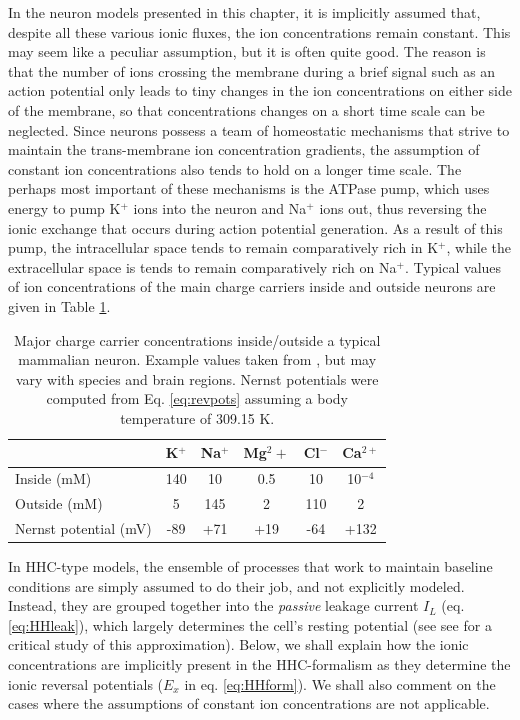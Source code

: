 In the neuron models presented in this chapter, it is implicitly assumed that, despite all these various ionic fluxes, the ion concentrations remain constant. This may seem like a peculiar assumption, but it is often quite good. The reason is that the number of ions crossing the membrane during a brief signal such as an action potential only leads to tiny changes in the ion concentrations on either side of the membrane, so that concentrations changes on a short time scale can be neglected. Since neurons possess a team of homeostatic mechanisms that strive to maintain the trans-membrane ion concentration gradients, the
assumption of constant ion concentrations also tends to hold on a longer time scale.  The perhaps most important of these mechanisms is the ATPase pump, which uses energy to pump K$^+$ ions into the neuron and Na$^+$ ions out, thus reversing the ionic exchange that occurs during action potential generation. As a result of this pump, the intracellular space tends to remain comparatively rich in K$^+$, while the extracellular space is tends to remain comparatively rich on Na$^+$. Typical values of ion concentrations of the main charge carriers inside and outside neurons are given in Table \ref{table:ion-concentrations}. 

\begin{table}[h]
\centering
\caption{Major charge carrier concentrations inside/outside a typical mammalian neuron. Example values taken from \cite{Wu2019}, but may vary with species and brain regions. Nernst potentials were computed from Eq. \ref{eq:revpots} assuming a body temperature of 309.15 K.}
\label{table:ion-concentrations}
{\begin{tabular}{lccccc}\toprule
						    & 	K$^+$	&	Na$^+$	&	Mg$^2+$	  &	Cl$^-$	&	Ca$^{2+}$	 \\ \midrule
Inside (mM)				    & 140		&		10	&		0.5	&	10		&  	10$^{-4}$	  	\\
Outside (mM)			           & 5			&		145	&		2	&	110 		&		2		  	\\
Nernst potential (mV)		    &	-89		&	    	+71	&		+19	&	-64		&		+132 		  	\\
\bottomrule
\end{tabular}}{}
\end{table}

In HHC-type models, the ensemble of processes that work to maintain baseline conditions are simply assumed to do their job, and not explicitly modeled. Instead, they are grouped together into the \textit{passive} leakage current $I_L$ (eq. \ref{eq:HHleak}), which largely determines the cell's resting potential (see see \cite{offner1991} for a critical study of this approximation). Below, we shall explain how the ionic concentrations are implicitly present in the HHC-formalism as they determine the ionic reversal potentials ($E_x$ in eq. \ref{eq:HHform}). We shall also comment on the cases where the assumptions of constant ion concentrations are not applicable. 



